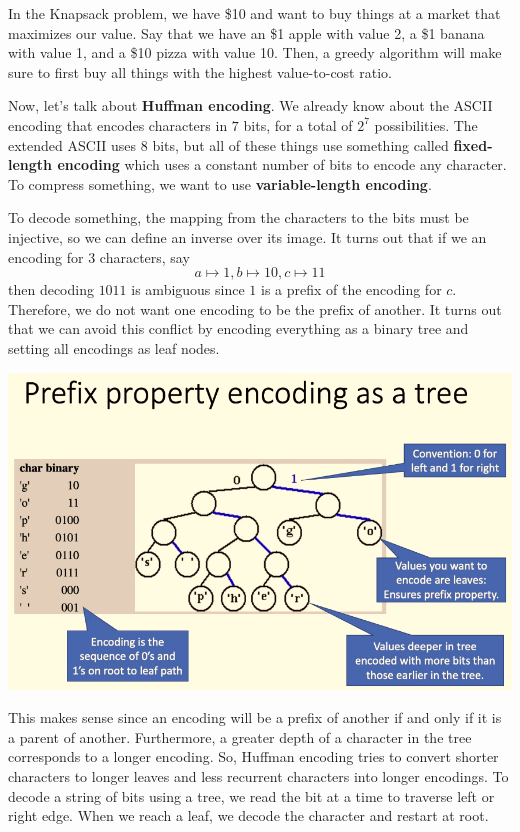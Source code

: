 \documentclass{article}
\begin{document}
    \begin{example}
    In the Knapsack problem, we have \$10 and want to buy things at a market that maximizes our value. Say that we have an \$1 apple with value 2, a \$1 banana with value 1, and a \$10 pizza with value 10. Then, a greedy algorithm will make sure to first buy all things with the highest value-to-cost ratio. 
    \end{example}

    Now, let's talk about \textbf{Huffman encoding}. We already know about the ASCII encoding that encodes characters in $7$ bits, for a total of $2^7$ possibilities. The extended ASCII uses $8$ bits, but all of these things use something called \textbf{fixed-length encoding} which uses a constant number of bits to encode any character. To compress something, we want to use \textbf{variable-length encoding}. 

    To decode something, the mapping from the characters to the bits must be injective, so we can define an inverse over its image. It turns out that if we an encoding for 3 characters, say 
    \[a \mapsto 1, b \mapsto 10, c \mapsto 11\]
    then decoding $1011$ is ambiguous since $1$ is a prefix of the encoding for $c$. Therefore, we do not want one encoding to be the prefix of another. It turns out that we can avoid this conflict by encoding everything as a binary tree and setting all encodings as leaf nodes. 
    \begin{center}
        \includegraphics[scale=0.5]{img/Tree_Encoding.png}
    \end{center}
    This makes sense since an encoding will be a prefix of another if and only if it is a parent of another. Furthermore, a greater depth of a character in the tree corresponds to a longer encoding. So, Huffman encoding tries to convert shorter characters to longer leaves and less recurrent characters into longer encodings. To decode a string of bits using a tree, we read the bit at a time to traverse left or right edge. When we reach a leaf, we decode the character and restart at root. 
\end{document}
